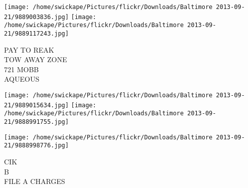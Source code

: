 \documentclass[10pt,letterpaper]{article}
\begin{document}
\texttt{[image: /home/swickape/Pictures/flickr/Downloads/Baltimore 2013-09-21/9889003836.jpg]}
\texttt{[image: /home/swickape/Pictures/flickr/Downloads/Baltimore 2013-09-21/9889117243.jpg]}

PAY TO REAK\\
TOW AWAY ZONE\\
721 MOBB\\
AQUEOUS
\pagebreak

\texttt{[image: /home/swickape/Pictures/flickr/Downloads/Baltimore 2013-09-21/9889015634.jpg]}
\texttt{[image: /home/swickape/Pictures/flickr/Downloads/Baltimore 2013-09-21/9888991755.jpg]}

\vspace{0.25in}
\texttt{[image: /home/swickape/Pictures/flickr/Downloads/Baltimore 2013-09-21/9888998776.jpg]}

CIK\\
B\\
FILE A CHARGES
\pagebreak
\end{document}
